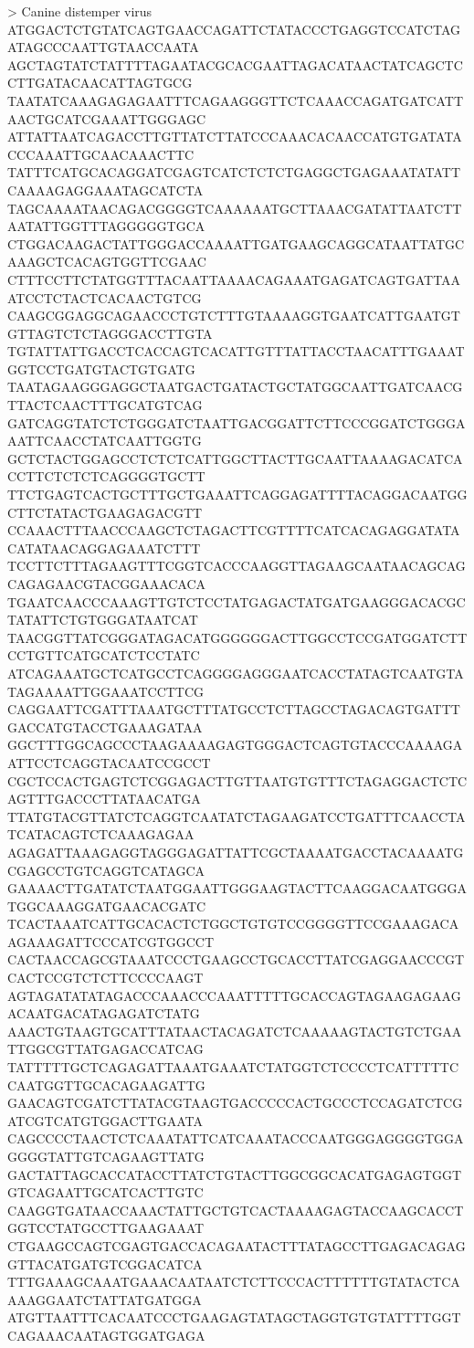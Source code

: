 > Canine distemper virus
ATGGACTCTGTATCAGTGAACCAGATTCTATACCCTGAGGTCCATCTAGATAGCCCAATTGTAACCAATA
AGCTAGTATCTATTTTAGAATACGCACGAATTAGACATAACTATCAGCTCCTTGATACAACATTAGTGCG
TAATATCAAAGAGAGAATTTCAGAAGGGTTCTCAAACCAGATGATCATTAACTGCATCGAAATTGGGAGC
ATTATTAATCAGACCTTGTTATCTTATCCCAAACACAACCATGTGATATACCCAAATTGCAACAAACTTC
TATTTCATGCACAGGATCGAGTCATCTCTCTGAGGCTGAGAAATATATTCAAAAGAGGAAATAGCATCTA
TAGCAAAATAACAGACGGGGTCAAAAAATGCTTAAACGATATTAATCTTAATATTGGTTTAGGGGGTGCA
CTGGACAAGACTATTGGGACCAAAATTGATGAAGCAGGCATAATTATGCAAAGCTCACAGTGGTTCGAAC
CTTTCCTTCTATGGTTTACAATTAAAACAGAAATGAGATCAGTGATTAAATCCTCTACTCACAACTGTCG
CAAGCGGAGGCAGAACCCTGTCTTTGTAAAAGGTGAATCATTGAATGTGTTAGTCTCTAGGGACCTTGTA
TGTATTATTGACCTCACCAGTCACATTGTTTATTACCTAACATTTGAAATGGTCCTGATGTACTGTGATG
TAATAGAAGGGAGGCTAATGACTGATACTGCTATGGCAATTGATCAACGTTACTCAACTTTGCATGTCAG
GATCAGGTATCTCTGGGATCTAATTGACGGATTCTTCCCGGATCTGGGAAATTCAACCTATCAATTGGTG
GCTCTACTGGAGCCTCTCTCATTGGCTTACTTGCAATTAAAAGACATCACCTTCTCTCTCAGGGGTGCTT
TTCTGAGTCACTGCTTTGCTGAAATTCAGGAGATTTTACAGGACAATGGCTTCTATACTGAAGAGACGTT
CCAAACTTTAACCCAAGCTCTAGACTTCGTTTTCATCACAGAGGATATACATATAACAGGAGAAATCTTT
TCCTTCTTTAGAAGTTTCGGTCACCCAAGGTTAGAAGCAATAACAGCAGCAGAGAACGTACGGAAACACA
TGAATCAACCCAAAGTTGTCTCCTATGAGACTATGATGAAGGGACACGCTATATTCTGTGGGATAATCAT
TAACGGTTATCGGGATAGACATGGGGGGACTTGGCCTCCGATGGATCTTCCTGTTCATGCATCTCCTATC
ATCAGAAATGCTCATGCCTCAGGGGAGGGAATCACCTATAGTCAATGTATAGAAAATTGGAAATCCTTCG
CAGGAATTCGATTTAAATGCTTTATGCCTCTTAGCCTAGACAGTGATTTGACCATGTACCTGAAAGATAA
GGCTTTGGCAGCCCTAAGAAAAGAGTGGGACTCAGTGTACCCAAAAGAATTCCTCAGGTACAATCCGCCT
CGCTCCACTGAGTCTCGGAGACTTGTTAATGTGTTTCTAGAGGACTCTCAGTTTGACCCTTATAACATGA
TTATGTACGTTATCTCAGGTCAATATCTAGAAGATCCTGATTTCAACCTATCATACAGTCTCAAAGAGAA
AGAGATTAAAGAGGTAGGGAGATTATTCGCTAAAATGACCTACAAAATGCGAGCCTGTCAGGTCATAGCA
GAAAACTTGATATCTAATGGAATTGGGAAGTACTTCAAGGACAATGGGATGGCAAAGGATGAACACGATC
TCACTAAATCATTGCACACTCTGGCTGTGTCCGGGGTTCCGAAAGACAAGAAAGATTCCCATCGTGGCCT
CACTAACCAGCGTAAATCCCTGAAGCCTGCACCTTATCGAGGAACCCGTCACTCCGTCTCTTCCCCAAGT
AGTAGATATATAGACCCAAACCCAAATTTTTGCACCAGTAGAAGAGAAGACAATGACATAGAGATCTATG
AAACTGTAAGTGCATTTATAACTACAGATCTCAAAAAGTACTGTCTGAATTGGCGTTATGAGACCATCAG
TATTTTTGCTCAGAGATTAAATGAAATCTATGGTCTCCCCTCATTTTTCCAATGGTTGCACAGAAGATTG
GAACAGTCGATCTTATACGTAAGTGACCCCCACTGCCCTCCAGATCTCGATCGTCATGTGGACTTGAATA
CAGCCCCTAACTCTCAAATATTCATCAAATACCCAATGGGAGGGGTGGAGGGGTATTGTCAGAAGTTATG
GACTATTAGCACCATACCTTATCTGTACTTGGCGGCACATGAGAGTGGTGTCAGAATTGCATCACTTGTC
CAAGGTGATAACCAAACTATTGCTGTCACTAAAAGAGTACCAAGCACCTGGTCCTATGCCTTGAAGAAAT
CTGAAGCCAGTCGAGTGACCACAGAATACTTTATAGCCTTGAGACAGAGGTTACATGATGTCGGACATCA
TTTGAAAGCAAATGAAACAATAATCTCTTCCCACTTTTTTGTATACTCAAAAGGAATCTATTATGATGGA
ATGTTAATTTCACAATCCCTGAAGAGTATAGCTAGGTGTGTATTTTGGTCAGAAACAATAGTGGATGAGA
